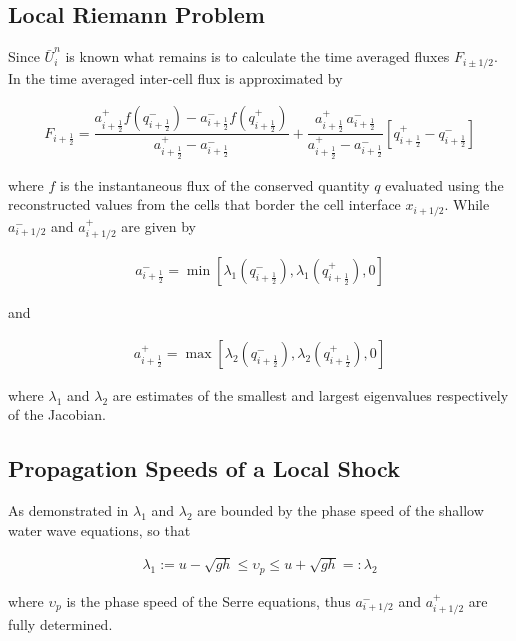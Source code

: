 \documentclass[SingleSpace,12pt,Proceedings]{Serre_ASCE}
\begin{document}
\subsection{Local Riemann Problem} %
Since $\bar{U}^{n}_i$ is known what remains is to calculate the time averaged fluxes $F_{i \pm 1/2}$. In  the time averaged inter-cell flux is approximated by
\begin{linenomath*}
\begin{gather}\label{eq:HLL_flux}
F_{i+\frac{1}{2}} = \dfrac{a^+_{i+\frac{1}{2}} f\left(q^-_{i+\frac{1}{2}}\right) - a^-_{i+\frac{1}{2}} f\left(q^+_{i+\frac{1}{2}}\right)}{a^+_{i+\frac{1}{2}} - a^-_{i+\frac{1}{2}}}  + \dfrac{a^+_{i+\frac{1}{2}} \, a^-_{i+\frac{1}{2}}}{a^+_{i+\frac{1}{2}} - a^-_{i+\frac{1}{2}}} \left [ q^+_{i+\frac{1}{2}} - q^-_{i+\frac{1}{2}} \right ]
\end{gather}
\end{linenomath*}
where $f$ is the instantaneous flux of the conserved quantity $q$ evaluated using the reconstructed values from the cells that border the cell interface $x_{i + 1/2}$. While $a^-_{i+1/2}$ and $a^+_{i+1/2}$ are given by
\begin{linenomath*}
\begin{gather*}
a^-_{i+\frac{1}{2}} = \min \left[\lambda_1\left(q^-_{i + \frac{1}{2}}\right), \lambda_1\left(q^+_{i + \frac{1}{2}}\right), 0 \right]
\end{gather*}
\end{linenomath*}
and
\begin{linenomath*}
\begin{gather*}
a^+_{i+\frac{1}{2}} = \max \left[\lambda_2\left(q^-_{i + \frac{1}{2}}\right), \lambda_2\left(q^+_{i + \frac{1}{2}}\right), 0 \right]
\end{gather*}
\end{linenomath*}
where $\lambda_1$ and $\lambda_2$ are estimates of the smallest and largest eigenvalues respectively of the Jacobian.
\subsection{Propagation Speeds of a Local Shock} %
As demonstrated in  $\lambda_1$ and $\lambda_2$ are bounded by the phase speed of the shallow water wave equations, so that
\begin{linenomath*}
\begin{gather*}
 \lambda_1 := u - \sqrt{gh} \le \upsilon_p \le u + \sqrt{gh} =: \lambda_2
\end{gather*}
\end{linenomath*}
where $\upsilon_p$ is the phase speed of the Serre equations, thus $a^-_{i+1/2}$ and $a^+_{i+1/2}$ are fully determined.
\end{document}
